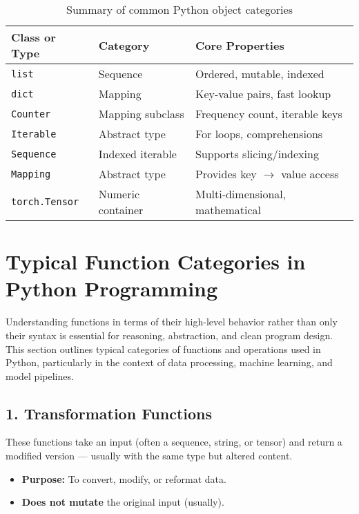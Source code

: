 \begin{table}[h!]
	\centering
	\renewcommand{\arraystretch}{1.3}
	\begin{tabular}{|l|l|l|}
		\hline
		\textbf{Class or Type} & \textbf{Category} & \textbf{Core Properties} \\
		\hline
		\texttt{list} & Sequence & Ordered, mutable, indexed \\
		\texttt{dict} & Mapping & Key-value pairs, fast lookup \\
		\texttt{Counter} & Mapping subclass & Frequency count, iterable keys \\
		\texttt{Iterable} & Abstract type & For loops, comprehensions \\
		\texttt{Sequence} & Indexed iterable & Supports slicing/indexing \\
		\texttt{Mapping} & Abstract type & Provides key $\rightarrow$ value access \\
		\texttt{torch.Tensor} & Numeric container & Multi-dimensional, mathematical \\
		\hline
	\end{tabular}
	\caption{Summary of common Python object categories}
\end{table}

\section{Typical Function Categories in Python Programming}

Understanding functions in terms of their high-level behavior rather than only their syntax is essential for reasoning, abstraction, and clean program design. This section outlines typical categories of functions and operations used in Python, particularly in the context of data processing, machine learning, and model pipelines.

\subsection*{1. Transformation Functions}

These functions take an input (often a sequence, string, or tensor) and return a modified version — usually with the same type but altered content.

\begin{itemize}
	\item \textbf{Purpose:} To convert, modify, or reformat data.
	\item \textbf{Does not mutate} the original input (usually).
\end{itemize}

